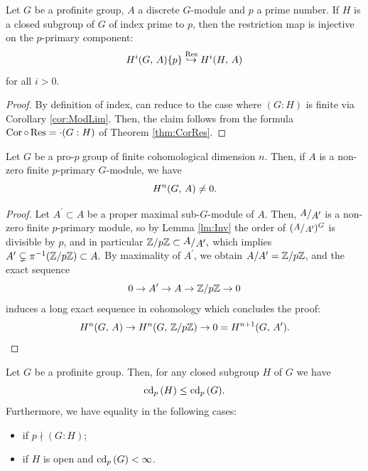 \documentclass[a4paper, oneside]{memoir}
\begin{document}
\begin{lemma}\label{lm:ResInj}
	Let $G$ be a profinite group, $A$ a discrete $G$-module and $p$ a prime number. If $H$ is a closed subgroup of $G$ of index prime to $p$, then the restriction map is injective on the $p$-primary component:
	\[
		H^{i}( G, \, A )\{p\}\overset{\operatorname{Res}}{\hookrightarrow}H^{i}( H, \, A )
	\]
	for all $i>0$.
\end{lemma}

\begin{proof}
	By definition of index, can reduce to the case where $(G:H)$ is finite via Corollary \ref{cor:ModLim}. Then, the claim follows from the formula $\operatorname{Cor}\circ \operatorname{Res} =\cdot (G:H)$ of Theorem \ref{thm:CorRes}.
\end{proof}

\begin{lemma}\label{lm:Hn0}
	Let $G$ be a pro-$p$ group of finite cohomological dimension $n$. Then, if $A$ is a non-zero finite $p$-primary $G$-module, we have
	\[
		H^{n}( G, \, A )\neq 0.
	\]
\end{lemma}

\begin{proof}
	Let $A^\prime \subset A$ be a proper maximal sub-$G$-module of $A$. Then, $\sfrac{A}{A^\prime}$ is a non-zero finite $p$-primary module, so by Lemma \ref{lm:Inv} the order of $(\sfrac{A}{A^\prime})^G$ is divisible by $p$, and in particular \(\Z /p\Z\subset \ssfrac{A}{A^\prime},\) which implies \(A^\prime\subsetneq\pi^{-1}{(\mathbb{Z}/p\mathbb{Z})}\subset A.\) By maximality of $A^\prime$, we obtain $A / A^\prime = \mathbb{Z} / p\mathbb{Z}$, and the exact sequence
	\[
		0\to A^\prime \to A \to \mathbb{Z} / p\mathbb{Z} \to 0
	\]
	induces a long exact sequence in cohomology which concludes the proof:
	\[H^{n}( G, \, A )\to H^{n}( G, \, \mathbb{Z} / p\mathbb{Z} )\to 0=H^{n+1}( G, \, A^\prime ).\]
\end{proof}

\begin{proposition}\label{prop:CdSgr}
	Let $G$ be a profinite group. Then, for any closed subgroup $H$ of $G$ we have
	\[
		\operatorname{cd}_p{(H)}\leq \operatorname{cd}_p{(G)}.
	\]
	Furthermore, we have equality in the following cases:
	\begin{itemize}
		\item if $p\nmid (G:H)$;
		\item if $H$ is open and $\operatorname{cd}_p{(G)}<\infty$.
	\end{itemize}
\end{proposition}
\end{document}

